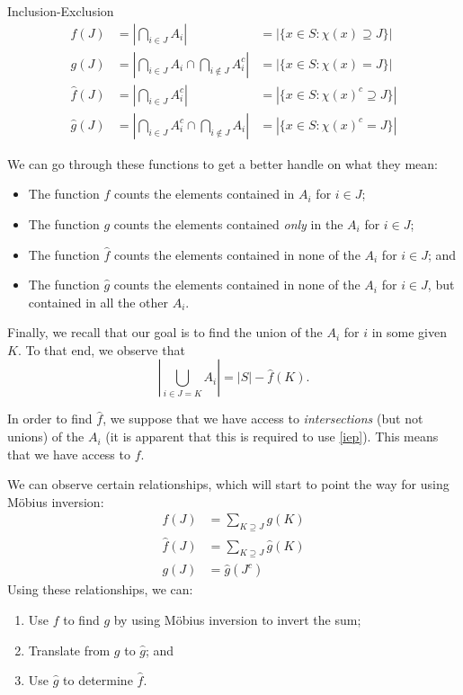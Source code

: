 \documentclass[12pt]{pom_thesis}
\begin{document}
\begin{chapter}{Inclusion-Exclusion}
\begin{align*}
f(J) &= \left| \bigcap_{i \in J} A_i\right| &= |\{x \in S: \chi(x) \supseteq J\}|\\
g(J) &= \left| \bigcap_{i \in J} A_i \cap \bigcap_{i \notin J} A_i^c\right| &= |\{x \in S: \chi(x) = J\}|\\
\hat{f}(J) &= \left| \bigcap_{i \in J} A_i^c\right| &= |\{x \in S: \chi(x)^c \supseteq J\}|\\
\hat{g}(J) &= \left|\bigcap_{i \in J} A_i^c \cap \bigcap_{i \notin J} A_i \right| &= |\{x \in S: \chi(x)^c = J\}|
\end{align*}

We can go through these functions to get a better handle on what they mean:
\begin{itemize}
\item The function $f$ counts the elements contained in $A_i$ for $i \in J$;
\item The function $g$ counts the elements contained \emph{only} in the $A_i$ for $i \in J$;
\item The function $\hat{f}$ counts the elements contained in none of the $A_i$ for $i \in J$; and
\item The function $\hat{g}$ counts the elements contained in none of the $A_i$ for $i \in J$, but contained in all the other $A_i$.
\end{itemize}
Finally, we recall that our goal is to find the union of the $A_i$ for $i$ in some given $K$. To that end, we observe that
\[
\left| \bigcup_{i \in J=K} A_i \right| = |S| - \hat{f}(K).
\]

In order to find $\hat{f}$, we suppose that we have access to \emph{intersections} (but not unions) of the $A_i$ (it is apparent that this is required to use \ref{iep}). This means that we have access to $f$. 

We can observe certain relationships, which will start to point the way for using M\"obius inversion:
\begin{align*}
f(J) &= \sum_{K \supseteq J} g(K)\\
\hat{f}(J) &= \sum_{K \supseteq J} \hat{g}(K)\\
g(J) &= \hat{g}(J^c)
\end{align*}
Using these relationships, we can:
\begin{enumerate}
\item Use $f$ to find $g$ by using M\"obius inversion to invert the sum;
\item Translate from $g$ to $\hat{g}$; and
\item Use $\hat{g}$ to determine $\hat{f}$.
\end{enumerate}


\end{chapter}
\end{document}
